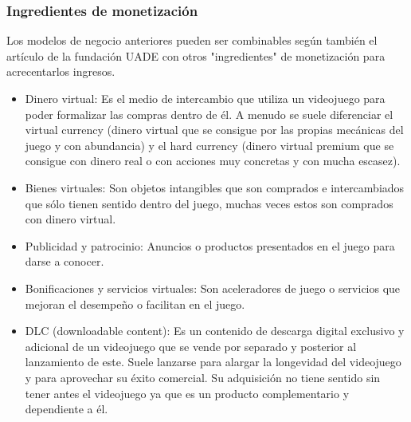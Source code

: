 \subsubsection{Ingredientes de monetización}
Los modelos de negocio anteriores pueden ser combinables según también el artículo de la fundación UADE \cite{fundacionuade2014} con otros "ingredientes" de monetización para acrecentarlos ingresos. 
\begin{itemize}
	\item Dinero virtual: Es el medio de intercambio que utiliza un videojuego para poder formalizar las compras dentro de él. A menudo se suele diferenciar el virtual currency (dinero virtual que se consigue por las propias mecánicas del juego y con abundancia) y el hard currency (dinero virtual premium que se consigue con dinero real o con acciones muy concretas y con mucha escasez).
	\item Bienes virtuales: Son objetos intangibles que son comprados e intercambiados que sólo tienen sentido dentro del juego, muchas veces estos son comprados con dinero virtual. 
	\item Publicidad y patrocinio: Anuncios o productos presentados en el juego para darse a conocer.
	\item Bonificaciones y servicios virtuales: Son aceleradores de juego o servicios que mejoran el desempeño o facilitan en el juego.
	\item DLC (downloadable content): Es un contenido de descarga digital exclusivo y adicional de un videojuego que se vende por separado y posterior al lanzamiento de este. Suele lanzarse para alargar la longevidad del videojuego y para aprovechar su éxito comercial. Su adquisición no tiene sentido sin tener antes el videojuego ya que es un producto complementario y dependiente a él.
\end{itemize}
